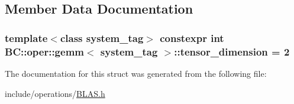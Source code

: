 \subsection{Member Data Documentation}
\subsubsection[{\texorpdfstring{tensor\+\_\+dimension}{tensor_dimension}}]{\setlength{\rightskip}{0pt plus 5cm}template$<$class system\+\_\+tag$>$ constexpr int {\bf B\+C\+::oper\+::gemm}$<$ system\+\_\+tag $>$\+::tensor\+\_\+dimension = 2\hspace{0.3cm}{\ttfamily [static]}}\hypertarget{structBC_1_1oper_1_1gemm_a01656da4d69b2fd870def1c369ecf63f}{}\label{structBC_1_1oper_1_1gemm_a01656da4d69b2fd870def1c369ecf63f}


The documentation for this struct was generated from the following file\+:\begin{DoxyCompactItemize}
\item 
include/operations/\hyperlink{operations_2BLAS_8h}{B\+L\+A\+S.\+h}\end{DoxyCompactItemize}
